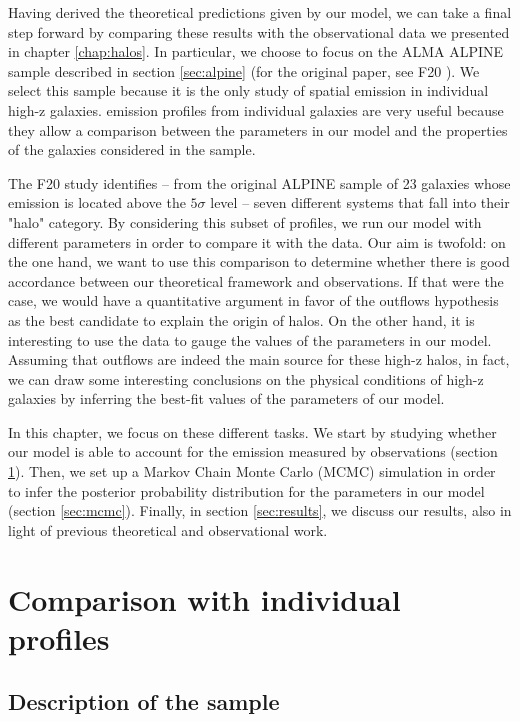 

Having derived the theoretical predictions given by our model, we can take a final step forward by comparing these results with the observational data we presented in chapter \ref{chap:halos}. In particular, we choose to focus on the ALMA ALPINE sample described in section \ref{sec:alpine} (for the original paper, see F20 \citep{Fujimoto:2020qzo}). We select this sample because it is the only study of \CII spatial emission in individual high-z galaxies. \CII emission profiles from individual galaxies are very useful because they allow a comparison between the parameters in our model and the properties of the galaxies considered in the sample. 

The F20 study identifies -- from the original ALPINE sample of 23 galaxies whose \CII emission is located above the $5\sigma$ level -- seven different systems that fall into their "\CII halo" category. By considering this subset of profiles, we run our model with different parameters in order to compare it with the data.
%
Our aim is twofold: on the one hand, we want to use this comparison to determine whether there is good accordance between our theoretical framework and observations. If that were the case, we would have a quantitative argument in favor of the outflows hypothesis as the best candidate to explain the origin of \CII halos.
%
On the other hand, it is interesting to use the data to gauge the values of the parameters in our model. Assuming that outflows are indeed the main source for these high-z halos, in fact, we can draw some interesting conclusions on the physical conditions of high-z galaxies by inferring the best-fit values of the parameters of our model. 

In this chapter, we focus on these different tasks. We start by studying whether our model is able to account for the \CII emission measured by observations (section \ref{sec:single_profiles_comp}). Then, we set up a Markov Chain Monte Carlo (MCMC) simulation in order to infer the posterior probability distribution for the parameters in our model (section \ref{sec:mcmc}). Finally, in section \ref{sec:results}, we discuss our results, also in light of previous theoretical and observational work. 


\section{Comparison with individual profiles} \label{sec:single_profiles_comp}

\subsection{Description of the sample} \label{sec:sample_description}

